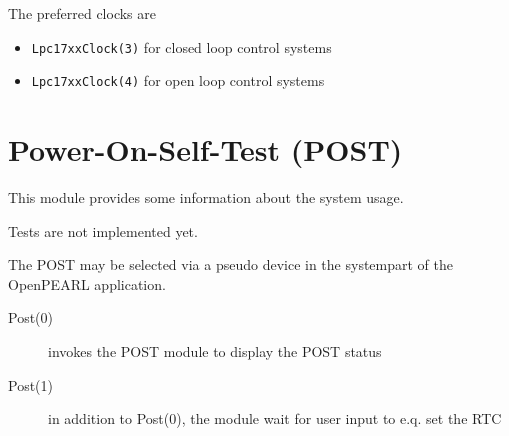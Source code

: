 The preferred clocks are 
\begin{itemize}
\item \texttt{Lpc17xxClock(3)} for closed loop control systems
\item \texttt{Lpc17xxClock(4)} for open loop control systems
\end{itemize} 


\section{Power-On-Self-Test (POST)}
This module provides some information about the system usage.

Tests are not implemented yet.

The POST may be selected via a pseudo device in the systempart of the 
OpenPEARL application.

\begin{description}
\item[Post(0)] invokes the POST module to display the POST status
\item[Post(1)] in addition to Post(0), the module wait for user input
   to e.q. set the RTC
\end{description}


